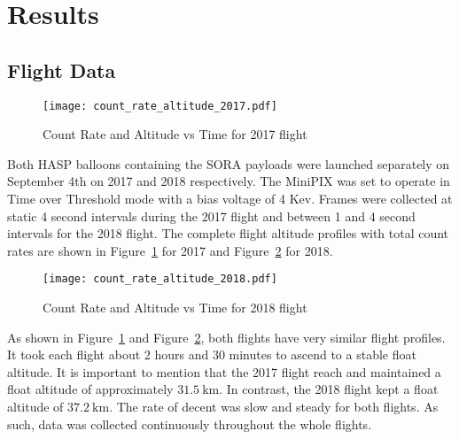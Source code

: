 \section{Results}
\label{Results}

\subsection{Flight Data}

\begin{figure}[H]
\centering
\texttt{[image: count\_rate\_altitude\_2017.pdf]}
\caption{Count Rate and Altitude vs Time for 2017 flight}
\label{fig:ratealttime_2017}
\end{figure}
%
Both HASP balloons containing the SORA payloads were launched separately on September 4th on 2017 and 2018 respectively.  The MiniPIX was set to operate in Time over Threshold mode with a bias voltage of 4 Kev.  Frames were collected at static 4 second intervals during the 2017 flight and between 1 and 4 second intervals for the 2018 flight.  The complete flight altitude profiles with total count rates are shown in Figure~\ref{fig:ratealttime_2017} for 2017 and Figure~\ref{fig:ratealttime_2018} for 2018.
%
\begin{figure}[H]
\centering
\texttt{[image: count\_rate\_altitude\_2018.pdf]}
\caption{Count Rate and Altitude vs Time for 2018 flight}
\label{fig:ratealttime_2018}
\end{figure}
%
As shown in Figure~\ref{fig:ratealttime_2017} and Figure~\ref{fig:ratealttime_2018}, both flights have very similar flight profiles.  It took each flight about 2 hours and 30 minutes to ascend to a stable float altitude.  It is important to mention that the 2017 flight reach and maintained a float altitude of approximately $\SI{31.5}{\kilo\meter}$.  In contrast, the 2018 flight kept a float altitude of $\SI{37.2}{\kilo\meter}$.  The rate of decent was slow and steady for both flights.  As such, data was collected continuously throughout the whole flights.
